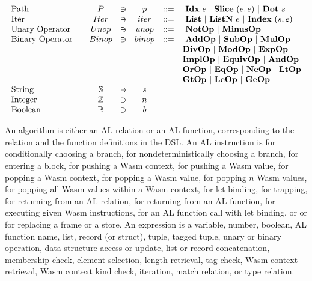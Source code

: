 \newpage
\begin{align*}
\begin{array}{lcccrlr}
%
  \text{Path}\quad& P &\ni& p &::=& ~ \idxp ~ e ~ | ~ \slicep ~ (e, e) ~ | ~ \dotp ~ s \\
%
  \text{Iter}\quad& Iter &\ni& iter &::=& ~ \listiter ~ | ~ \listniter ~ e ~|~ \listidxiter ~ (s, e) \\
%
  \text{Unary Operator}\quad& Unop &\ni& unop &::=& ~ \notop ~ | ~ \minusop \\
  \text{Binary Operator}\quad& Binop &\ni& binop &::=& ~ \addop ~ | ~ \subop ~ | ~ \mulop \\
    &&&& | & \divop ~ | ~ \modop ~ | ~ \expop \\
    &&&& | & \implop ~ | ~ \equivop ~ | ~ \andop \\
    &&&& | & \orop ~ | ~ \eqop ~ | ~ \neop ~ | ~ \ltop \\
    &&&& | & \gtop ~ | ~ \leop ~ | ~ \geop \\
  \text{String}\quad& \mathbb S &\ni& s \\
  \text{Integer}\quad& \mathbb Z &\ni& n \\
  \text{Boolean}\quad& \mathbb B &\ni& b \\
\end{array}
\end{align*}

An algorithm is either an AL relation or an AL function, corresponding to the
relation and the function definitions in the DSL.
An AL instruction is \ifi{} for conditionally choosing a branch, \eitheri{} for
nondeterministically choosing a branch, \enteri{} for entering a block,
\pushctxi{} for pushing a Wasm context, \pushi{} for pushing a Wasm value,
\popctxi{} for popping a Wasm context, \popi{} for popping a Wasm value,
\popni{} for popping $n$ Wasm values, \popalli{} for popping all Wasm values
within a Wasm context,  for let binding, \trapi{} for trapping,
\returnreli{} for returning from an AL relation, \returnfuni{} for returning
from an AL function, \executei{} for executing given Wasm instructions,
\calli{} for an AL function call with let binding, or \replaceframei{} or
\replacestorei for replacing a frame or a store.
An expression is a variable, number, boolean, AL function name, list, record
(or struct), tuple, tagged tuple, unary or binary operation, data structure
access or update, list or record concatenation, membership check, element
selection, length retrieval, tag check, Wasm context retrieval, Wasm context
kind check, iteration, match relation, or type relation.


